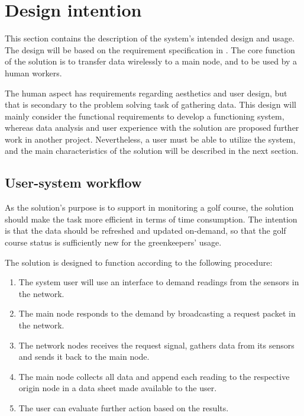 \section{Design intention}
This section contains the description of the system's intended design and usage. The design will be based on the requirement specification in . The core function of the solution is to transfer data wirelessly to a main node, and to be used by a human workers. 

The human aspect has requirements regarding aesthetics and user design, but that is secondary to the problem solving task of gathering data. This design will mainly consider the functional requirements to develop a functioning system, whereas data analysis and user experience with the solution are proposed further work in another project. Nevertheless, a user must be able to utilize the system, and the main characteristics of the solution will be described in the next section.

\subsection{User-system workflow}
As the solution's purpose is to support in monitoring a golf course, the solution should make the task more efficient in terms of time consumption. The intention is that the data should be refreshed and updated on-demand, so that the golf course status is sufficiently new for the greenkeepers' usage.

The solution is designed to function according to the following procedure:
\begin{enumerate}
	\item The system user will use an interface to demand readings from the sensors in the network.
	\item The main node responds to the demand by broadcasting a request packet in the network.
	\item The network nodes receives the request signal, gathers data from its sensors and sends it back to the main node.
	\item The main node collects all data and append each reading to the respective origin node in a data sheet made available to the user.
	\item The user can evaluate further action based on the results.
\end{enumerate}

